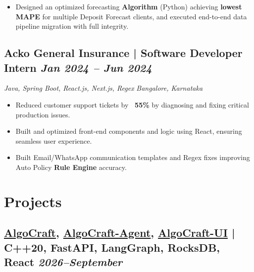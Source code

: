\documentclass[a4paper,10pt]{article}
\newcommand{\subtext}[1]{
#1\par\vspace{-0.2cm}}
\newenvironment{zitemize}{
\begin{itemize}\itemsep0pt \parskip0pt \parsep1pt}
{\end{itemize}\vspace{-0.7cm}}
\begin{document}
\begin{zitemize}
\item Designed an optimized forecasting \textbf{Algorithm} (Python) achieving \textbf{lowest MAPE} for multiple Deposit Forecast clients, and executed end-to-end data pipeline migration with full integrity.
\end{zitemize}
\vspace{0.1cm}

\subsection*{Acko General Insurance | Software Developer Intern \hfill {\small\textit{Jan 2024 – Jun 2024}}}
\subtext{\textit{Java, Spring Boot, React.js, Next.js, Regex} \hfill \textit{Bangalore, Karnataka}}
\begin{zitemize}
\item Reduced customer support tickets by \textbf{~55\%} by diagnosing and fixing critical production issues.
\item Built and optimized front-end components and logic using React, ensuring seamless user experience.
\item Built Email/WhatsApp communication templates and Regex fixes improving Auto Policy \textbf{Rule Engine} accuracy.
\end{zitemize}
\vspace{0.0cm}


\section{Projects}

\subsection*{\fontsize{10pt}{12pt}\selectfont\href{https://github.com/Ruhangrk/AlgoCraft}{{\textcolor{custompurple}{\mdseries AlgoCraft}}}, \href{https://github.com/Ruhangrk/AlgoCraft-Agent}{{\textcolor{custompurple}{\mdseries AlgoCraft-Agent}}}, \href{https://github.com/Ruhangrk/AlgoCraft-UI}{{\textcolor{custompurple}{\mdseries AlgoCraft-UI}}} | C++20, FastAPI, LangGraph, RocksDB, React \hfill {\small\textit{2026--September}}}
\end{document}
